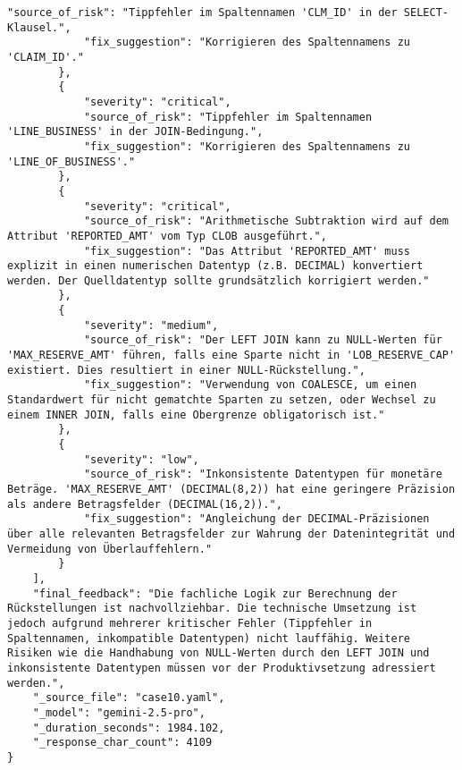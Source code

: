 \begin{lstlisting}[caption={Ausgabe: GEMINI 2.5 Pro Anwendungsfall 10 Konsistenzdurchlauf},label={gemini_case10_prompt2}]
            "source_of_risk": "Tippfehler im Spaltennamen 'CLM_ID' in der SELECT-Klausel.",
            "fix_suggestion": "Korrigieren des Spaltennamens zu 'CLAIM_ID'."
        },
        {
            "severity": "critical",
            "source_of_risk": "Tippfehler im Spaltennamen 'LINE_BUSINESS' in der JOIN-Bedingung.",
            "fix_suggestion": "Korrigieren des Spaltennamens zu 'LINE_OF_BUSINESS'."
        },
        {
            "severity": "critical",
            "source_of_risk": "Arithmetische Subtraktion wird auf dem Attribut 'REPORTED_AMT' vom Typ CLOB ausgeführt.",
            "fix_suggestion": "Das Attribut 'REPORTED_AMT' muss explizit in einen numerischen Datentyp (z.B. DECIMAL) konvertiert werden. Der Quelldatentyp sollte grundsätzlich korrigiert werden."
        },
        {
            "severity": "medium",
            "source_of_risk": "Der LEFT JOIN kann zu NULL-Werten für 'MAX_RESERVE_AMT' führen, falls eine Sparte nicht in 'LOB_RESERVE_CAP' existiert. Dies resultiert in einer NULL-Rückstellung.",
            "fix_suggestion": "Verwendung von COALESCE, um einen Standardwert für nicht gematchte Sparten zu setzen, oder Wechsel zu einem INNER JOIN, falls eine Obergrenze obligatorisch ist."
        },
        {
            "severity": "low",
            "source_of_risk": "Inkonsistente Datentypen für monetäre Beträge. 'MAX_RESERVE_AMT' (DECIMAL(8,2)) hat eine geringere Präzision als andere Betragsfelder (DECIMAL(16,2)).",
            "fix_suggestion": "Angleichung der DECIMAL-Präzisionen über alle relevanten Betragsfelder zur Wahrung der Datenintegrität und Vermeidung von Überlauffehlern."
        }
    ],
    "final_feedback": "Die fachliche Logik zur Berechnung der Rückstellungen ist nachvollziehbar. Die technische Umsetzung ist jedoch aufgrund mehrerer kritischer Fehler (Tippfehler in Spaltennamen, inkompatible Datentypen) nicht lauffähig. Weitere Risiken wie die Handhabung von NULL-Werten durch den LEFT JOIN und inkonsistente Datentypen müssen vor der Produktivsetzung adressiert werden.",
    "_source_file": "case10.yaml",
    "_model": "gemini-2.5-pro",
    "_duration_seconds": 1984.102,
    "_response_char_count": 4109
}
\end{lstlisting}


